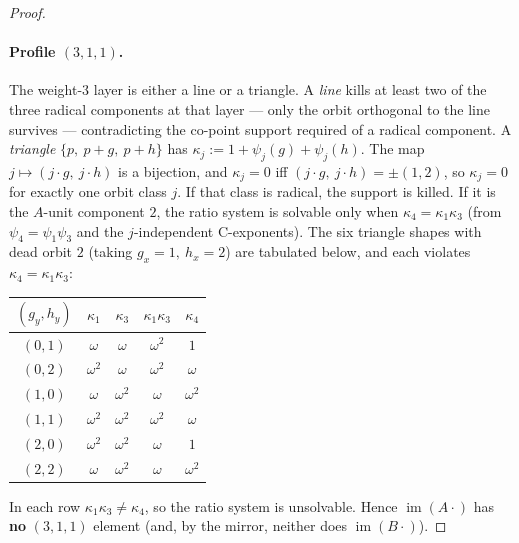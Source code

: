 \documentclass[11pt]{article}
\DeclareMathOperator{\img}{im}
\theoremstyle{plain}
\theoremstyle{definition}
\theoremstyle{remark}
\begin{document}
\begin{proof}
\paragraph{Profile $(3,1,1)$.} The weight-$3$ layer is either a line or a triangle. A
\emph{line} kills at least two of the three radical components at that layer --- only the
orbit orthogonal to the line survives --- contradicting the co-point support required of a
radical component. A \emph{triangle} $\{p,\ p+g,\ p+h\}$ has
$\kappa_j:=1+\psi_j(g)+\psi_j(h)$. The map $j\mapsto(j\!\cdot\! g,\ j\!\cdot\! h)$ is a
bijection, and $\kappa_j=0$ iff $(j\!\cdot\! g,\ j\!\cdot\! h)=\pm(1,2)$, so $\kappa_j=0$
for exactly one orbit class $j$. If that class is radical, the support is killed. If it is
the $A$-unit component $2$, the ratio system is solvable only when $\kappa_4=\kappa_1\kappa_3$
(from $\psi_4=\psi_1\psi_3$ and the $j$-independent C-exponents). The six triangle shapes
with dead orbit $2$ (taking $g_x=1,\ h_x=2$) are tabulated below, and each violates
$\kappa_4=\kappa_1\kappa_3$:
\begin{center}
\renewcommand{\arraystretch}{1.2}
\begin{tabular}{ccccc}
\toprule
$(g_y,h_y)$ & $\kappa_1$ & $\kappa_3$ & $\kappa_1\kappa_3$ & $\kappa_4$\\
\midrule
$(0,1)$ & $\omega$   & $\omega$   & $\omega^2$ & $1$\\
$(0,2)$ & $\omega^2$ & $\omega$   & $\omega^2$ & $\omega$\\
$(1,0)$ & $\omega$   & $\omega^2$ & $\omega$   & $\omega^2$\\
$(1,1)$ & $\omega^2$ & $\omega^2$ & $\omega^2$ & $\omega$\\
$(2,0)$ & $\omega^2$ & $\omega^2$ & $\omega$   & $1$\\
$(2,2)$ & $\omega$   & $\omega^2$ & $\omega$   & $\omega^2$\\
\bottomrule
\end{tabular}
\end{center}
In each row $\kappa_1\kappa_3\ne\kappa_4$, so the ratio system is unsolvable. Hence
$\img(A\cdot)$ has \textbf{no} $(3,1,1)$ element (and, by the mirror, neither does
$\img(B\cdot)$).


\end{proof}
\end{document}
